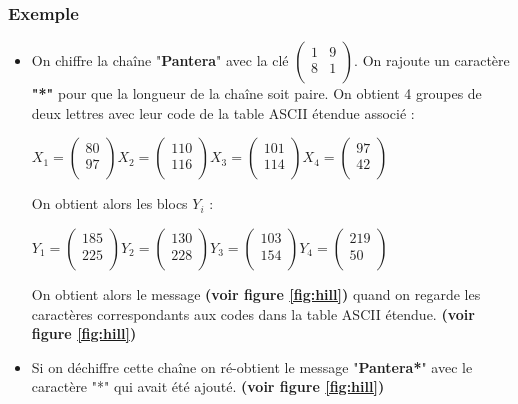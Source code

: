 \documentclass{article}
\begin{document}
\subsubsection{Exemple}
\begin{itemize}
\item On chiffre la chaîne "\textbf{Pantera}" avec la clé $\begin{pmatrix}
1&9\\
8&1\\
\end{pmatrix}$. On rajoute un caractère \textbf{"*"} pour que la longueur de la chaîne soit paire.
On obtient 4 groupes de deux lettres avec leur code de la table ASCII étendue associé :

\( X_1 = \begin{pmatrix}
80\\
97\\
\end{pmatrix} X_2 = 
\begin{pmatrix}
110\\
116\\
\end{pmatrix} X_3 = 
\begin{pmatrix}
101\\
114\\
\end{pmatrix} 
X_4 = \begin{pmatrix}
97\\
42\\
\end{pmatrix} \)
\vspace{1\baselineskip}

On obtient alors les blocs $Y_i$ : 

\( Y_1 = \begin{pmatrix}
185\\
225\\
\end{pmatrix} Y_2 = 
\begin{pmatrix}
130\\
228\\
\end{pmatrix} Y_3 = 
\begin{pmatrix}
103\\
154\\
\end{pmatrix} 
Y_4 = \begin{pmatrix}
219\\
50\\
\end{pmatrix} \)
\vspace{1\baselineskip}


On obtient alors le message \textbf{(voir figure \ref{fig:hill})} quand on regarde les caractères correspondants aux codes dans la table ASCII étendue. \textbf{(voir figure \ref{fig:hill})}
\vspace{1\baselineskip}

\item Si on déchiffre cette chaîne on ré-obtient le message "\textbf{Pantera*}" avec le caractère "*" qui avait été ajouté. \textbf{(voir figure \ref{fig:hill})}

\end{itemize} 
\end{document}
